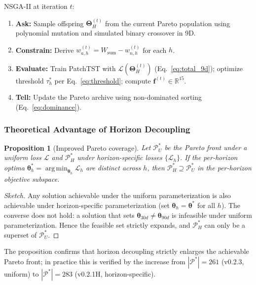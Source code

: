 ﻿\documentclass[twocolumn]{article}
\newtheorem{proposition}{Proposition}
\DeclareMathOperator*{\argmin}{arg\,min}
\begin{document}
NSGA-II at iteration $t$:
\begin{enumerate}[leftmargin=*,topsep=2pt,itemsep=1pt]
  \item \textbf{Ask:} Sample offspring $\boldsymbol{\Theta}_H^{(t)}$
        from the current Pareto population using polynomial mutation
        and simulated binary crossover in 9D.
  \item \textbf{Constrain:} Derive
        $w_{a,h}^{(t)} = W_\mathrm{sum} - w_{n,h}^{(t)}$ for each $h$.
  \item \textbf{Evaluate:} Train PatchTST with
        $\mathcal{L}(\boldsymbol{\Theta}_H^{(t)})$ (Eq.~\ref{eq:total_9d});
        optimize threshold $\tau_h^*$ per Eq.~\ref{eq:threshold};
        compute $\mathbf{f}^{(t)}\in\mathbb{R}^{15}$.  \item \textbf{Tell:} Update the Pareto archive using
        non-dominated sorting (Eq.~\ref{eq:dominance}).
\end{enumerate}

\subsubsection{Theoretical Advantage of Horizon Decoupling}

\begin{proposition}[Improved Pareto coverage]
Let $\mathcal{P}^*_U$ be the Pareto front under a uniform loss
$\mathcal{L}$ and $\mathcal{P}^*_H$ under horizon-specific losses
$\{\mathcal{L}_h\}$.
If the per-horizon optima
$\boldsymbol{\theta}_h^* = \argmin_{\boldsymbol{\theta}_h}\mathcal{L}_h$
are distinct across $h$, then $\mathcal{P}^*_H \supseteq \mathcal{P}^*_U$
in the per-horizon objective subspace.
\end{proposition}
\begin{proof}[Sketch]
Any solution achievable under the uniform parameterization
is also achievable under horizon-specific parameterization
(set $\boldsymbol{\theta}_h = \boldsymbol{\theta}^*$ for all $h$).
The converse does not hold: a solution that sets
$\boldsymbol{\theta}_{30d} \neq \boldsymbol{\theta}_{90d}$
is infeasible under uniform parameterization.
Hence the feasible set strictly expands, and $\mathcal{P}^*_H$
can only be a superset of $\mathcal{P}^*_U$.
\end{proof}

The proposition confirms that horizon decoupling strictly enlarges
the achievable Pareto front; in practice this is verified by the
increase from $|\mathcal{P}^*|{=}261$ (v0.2.3, uniform) to
$|\mathcal{P}^*|{=}283$ (v0.2.1H, horizon-specific).
\end{document}
